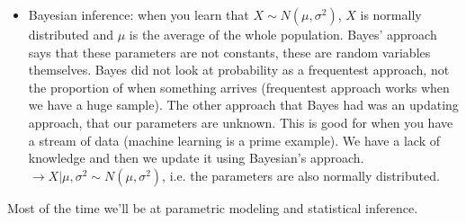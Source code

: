 \documentclass[12 pt]{article}
\begin{document}
\begin{itemize}
          \item Bayesian inference: when you learn that $X \sim N(\mu,
            \sigma^2)$, $X$ is normally distributed and $\mu$ is the
            average of the whole population. Bayes' approach says that
            these parameters are not constants, these are random
            variables themselves. Bayes did not look at probability as
            a frequentest approach, not the proportion of when something
            arrives (frequentest approach works when we have a huge
            sample). The other approach that Bayes had was an updating
            approach, that our parameters are unknown. This is good
            for when you have a stream of data (machine learning is a
            prime example). We have a lack of knowledge and then we
            update it using Bayesian's approach. $\to X | \mu,
            \sigma^2 \sim N (\mu, \sigma^2)$, i.e. the parameters are
            also normally distributed.
          \end{itemize}
          Most of the time we'll be at parametric modeling and
          statistical inference.
\end{document}
